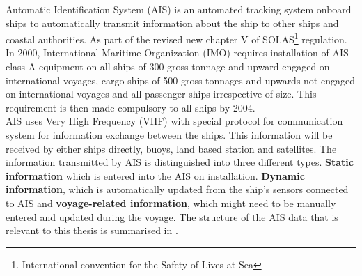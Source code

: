 Automatic Identification System (AIS) is an automated tracking system onboard ships to automatically transmit information about the ship to other ships and coastal authorities. As part of the revised new chapter V of SOLAS\footnote{International convention for the Safety of Lives at Sea} regulation. In 2000, International Maritime Organization (IMO) requires installation of AIS class A equipment on all ships of 300 gross tonnage and upward engaged on international voyages, cargo ships of 500 gross tonnages and upwards not engaged on international voyages and all passenger ships irrespective of size. This requirement is then made compulsory to all ships by 2004. \cite{Rakke2016,webimo.2014}\\

AIS uses Very High Frequency (VHF) with special protocol for communication system for information exchange between the ships. This information will be received by either ships directly, buoys, land based station and satellites. The information transmitted by AIS is distinguished into three different types. \textbf{Static information} which is entered into the AIS on installation. \textbf{Dynamic information}, which is automatically updated from the ship's sensors connected to AIS and \textbf{voyage-related information}, which might need to be manually entered and updated during the voyage. The structure of the AIS data that is relevant to this thesis is summarised in \cite{webimo.2014}.\\


